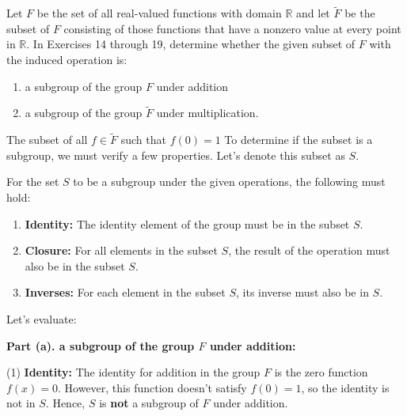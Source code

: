 \documentclass[12pt]{amsart}
\theoremstyle{definition}
\numberwithin{equation}{section}
\theoremstyle{plain}
\newcommand{\R}{\mathbb{R}}
\begin{document}
    \begin{exercise}{17}
        Let $F$ be the set of all real-valued functions with domain $\R$ and let $\tilde{F}$ be the subset of $F$ consisting of those functions
that have a nonzero value at every point in $\R$. In Exercises 14 through 19, determine whether the given subset of $F$ with the induced operation is:
 \begin{enumerate}[label=(\alph*.)]
    \item  a subgroup of the group $F$ under addition
    \item  a subgroup of the group $\tilde{F}$ under multiplication.
 \end{enumerate}

 The subset of all $f \in \tilde{F}$ such that $f(0) =1$
 To determine if the subset is a subgroup, we must verify a few properties. Let's denote this subset as \( S \).

 For the set \( S \) to be a subgroup under the given operations, the following must hold:
 
 \begin{enumerate}
    \item \textbf{Identity:} The identity element of the group must be in the subset \( S \).
    \item \textbf{Closure:} For all elements in the subset \( S \), the result of the operation must also be in the subset \( S \).
    \item \textbf{Inverses:} For each element in the subset \( S \), its inverse must also be in \( S \).
 \end{enumerate}
 
 Let's evaluate:
 
\textbf{Part (a). a subgroup of the group \( F \) under addition:}
 
 (1) \textbf{Identity:} The identity for addition in the group \( F \) is the zero function \( f(x) = 0 \). However, this function doesn't satisfy \( f(0) = 1 \), so the identity is not in \( S \). Hence, \( S \) is \textbf{not} a subgroup of \( F \) under addition.
 

\end{exercise}
\end{document}
